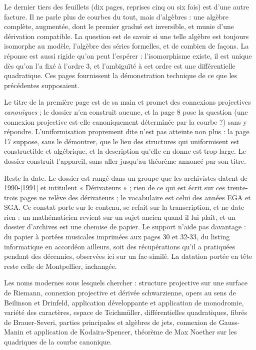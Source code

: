 \documentclass[11pt,a4paper]{article}
\begin{document}
\begin{resume}
Le dernier tiers des feuillets (dix pages, reprises cinq ou six fois) est
d'une autre facture. Il ne parle plus de courbes du tout, mais d'algèbres :
une algèbre complète, augmentée, dont le premier gradué est inversible, et
munie d'une dérivation compatible. La question est de savoir si une telle
algèbre est toujours isomorphe au modèle, l'algèbre des séries formelles, et
de combien de façons. La réponse est aussi rigide qu'on peut l'espérer :
l'isomorphisme existe, il est unique dès qu'on l'a fixé à l'ordre $3$, et
l'ambiguïté à cet ordre est une différentielle quadratique. Ces pages
fournissent la démonstration technique de ce que les précédentes supposaient.

Le titre de la première page est de sa main et
promet des connexions projectives \emph{canoniques} ; le dossier n'en construit
aucune, et la page 8 pose la question (une connexion projective est-elle
canoniquement déterminée par la courbe ?) sans y répondre. L'uniformisation
proprement dite n'est pas atteinte non plus : la page 17 suppose, sans le
démontrer, que le lieu des structures qui uniformisent est constructible et
algébrique, et la description qu'elle en donne est trop large. Le dossier construit l'appareil, sans aller jusqu'au théorème
annoncé par son titre.

Reste la date. Le dossier est rangé dans
un groupe que les archivistes datent de 1990-[1991] et intitulent
« Dérivateurs » ; rien de ce qui est écrit sur ces trente-trois pages ne relève
des dérivateurs ; le vocabulaire est celui des années EGA et SGA. Ce constat
porte sur le contenu, se refait sur la transcription, et ne date rien : un
mathématicien revient sur un sujet ancien quand il lui plaît, et un dossier
d'archives est une chemise de papier. Le support n'aide pas davantage : du
papier à portées musicales imprimées aux pages 30 et 32-33, du listing
informatique en accordéon ailleurs, soit des récupérations qu'il a pratiquées
pendant des décennies, observées ici sur un fac-similé. La datation portée en tête
reste celle de Montpellier, inchangée.

Les noms modernes sous lesquels chercher : structure projective sur une
surface de Riemann, connexion projective et dérivée schwarzienne, opers au
sens de Beilinson et Drinfeld, application développante et application de
monodromie, variété des caractères, espace de Teichmüller, différentielles
quadratiques, fibrés de Brauer-Severi, parties principales et algèbres de
jets, connexion de Gauss-Manin et application de Kodaira-Spencer, théorème de
Max Noether sur les quadriques de la courbe canonique.


\end{resume}
\end{document}
